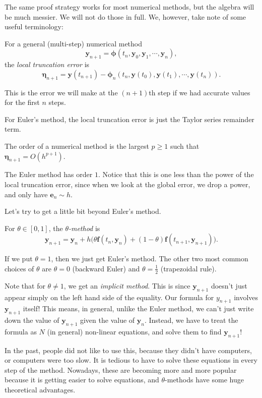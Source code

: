 \documentclass[a4paper]{article}
\begin{document}
The same proof strategy works for most numerical methods, but the algebra will be much messier. We will not do those in full. We, however, take note of some useful terminology:
\begin{defi}
  For a general (multi-step) numerical method
  \[
    \mathbf{y}_{n + 1} = \boldsymbol\phi (t_n, \mathbf{y}_0, \mathbf{y}_1, \cdots,\mathbf{y}_n),
  \]
  the \emph{local truncation error} is
  \[
    \boldsymbol\eta_{n + 1} = \mathbf{y}(t_{n + 1}) - \boldsymbol\phi_n(t_n, \mathbf{y}(t_0), \mathbf{y}(t_1), \cdots, \mathbf{y}(t_n)).
  \]
\end{defi}
This is the error we will make at the $(n + 1)$th step if we had accurate values for the first $n$ steps.

For Euler's method, the local truncation error is just the Taylor series remainder term.

\begin{defi}[Order]
  The order of a numerical method is the largest $p \geq 1$ such that $\boldsymbol\eta_{n + 1} = O(h^{p + 1})$.
\end{defi}
The Euler method has order $1$. Notice that this is one less than the power of the local truncation error, since when we look at the global error, we drop a power, and only have $\mathbf{e}_n \sim h$.

Let's try to get a little bit beyond Euler's method.
\begin{defi}
  For $\theta \in [0, 1]$, the \emph{$\theta$-method} is
  \[
    \mathbf{y}_{n + 1} = \mathbf{y}_n + h\Big( \theta \mathbf{f}(t_n, \mathbf{y}_n) + (1 - \theta) \mathbf{f}(t_{n + 1}, \mathbf{y}_{n + 1})\Big).
  \]
\end{defi}
If we put $\theta = 1$, then we just get Euler's method. The other two most common choices of $\theta$ are $\theta = 0$ (backward Euler) and $\theta = \frac{1}2$ (trapezoidal rule).

Note that for $\theta \not= 1$, we get an \emph{implicit method}. This is since $\mathbf{y}_{n + 1}$ doesn't just appear simply on the left hand side of the equality. Our formula for $y_{n + 1}$ involves $\mathbf{y}_{n + 1}$ itself! This means, in general, unlike the Euler method, we can't just write down the value of $\mathbf{y}_{n + 1}$ given the value of $\mathbf{y}_n$. Instead, we have to treat the formula as $N$ (in general) non-linear equations, and solve them to find $\mathbf{y}_{n + 1}$!

In the past, people did not like to use this, because they didn't have computers, or computers were too slow. It is tedious to have to solve these equations in every step of the method. Nowadays, these are becoming more and more popular because it is getting easier to solve equations, and $\theta$-methods have some huge theoretical advantages.
\end{document}
